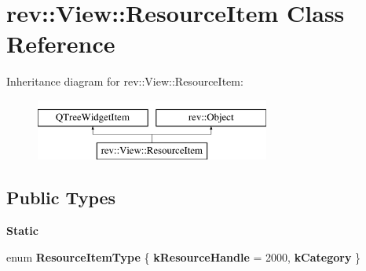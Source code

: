 \hypertarget{classrev_1_1_view_1_1_resource_item}{}\section{rev\+::View\+::Resource\+Item Class Reference}
\label{classrev_1_1_view_1_1_resource_item}
Inheritance diagram for rev\+::View\+::Resource\+Item\+:\begin{figure}[H]
\begin{center}
\leavevmode
\includegraphics[height=2.000000cm]{classrev_1_1_view_1_1_resource_item}
\end{center}
\end{figure}
\subsection*{Public Types}
\begin{Indent}\textbf{ Static}\par
\begin{DoxyCompactItemize}
\item 
\mbox{\label{classrev_1_1_view_1_1_resource_item_a445ba0a05bf4c8075d88f4beec5d91e6}} 
enum {\bfseries Resource\+Item\+Type} \{ {\bfseries k\+Resource\+Handle} = 2000, 
{\bfseries k\+Category}
 \}
\end{DoxyCompactItemize}
\end{Indent}

